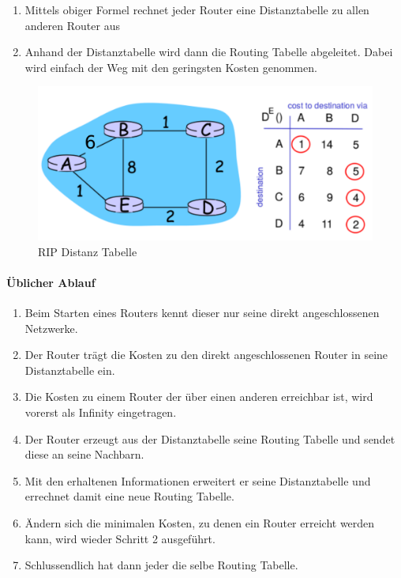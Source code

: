 \begin{enumerate}
	\item Mittels obiger Formel rechnet jeder Router eine Distanztabelle zu  allen anderen Router aus
	\item Anhand der Distanztabelle wird dann die Routing Tabelle abgeleitet. Dabei wird einfach der Weg mit den geringsten Kosten genommen.
\end{enumerate}

\begin{figure}[h]
\centering
\includegraphics[width=0.7\linewidth]{images/rip}
\caption{RIP Distanz Tabelle}
\end{figure}

\paragraph{Üblicher Ablauf}
\begin{enumerate}
	\item Beim Starten eines Routers kennt dieser nur seine direkt angeschlossenen Netzwerke.
	\item Der Router trägt die Kosten zu den direkt angeschlossenen Router in seine Distanztabelle ein.
	\item Die Kosten zu einem Router der über einen anderen erreichbar ist, wird vorerst als Infinity eingetragen.
	\item Der Router erzeugt aus der Distanztabelle seine Routing Tabelle und sendet diese an seine Nachbarn.
	\item Mit den erhaltenen Informationen erweitert er seine Distanztabelle und errechnet damit eine neue Routing Tabelle.
	\item Ändern sich die minimalen Kosten, zu denen ein Router erreicht werden kann, wird wieder Schritt 2 ausgeführt.
	\item Schlussendlich hat dann jeder die selbe Routing Tabelle.
\end{enumerate}

